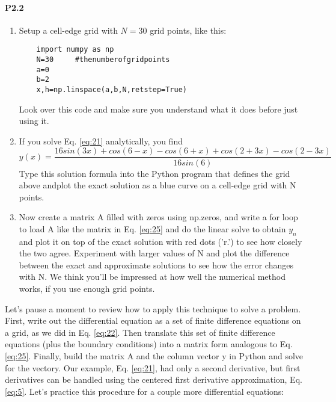 \paragraph*{P2.2}
\begin{enumerate}[label=(\alph*)]
	\item  Setup a cell-edge grid with $N=30$ grid points, like this: 
	\begin{lstlisting}	
	import numpy as np 
	N=30     #thenumberofgridpoints 
	a=0 
	b=2 
	x,h=np.linspace(a,b,N,retstep=True)
	\end{lstlisting}	
	 Look over this code and make sure you understand what it does before just using it.
	\item If you solve Eq. \eqref{eq:21} analytically, you find
	\begin{equation}
	y(x) = \frac{16sin(3x)+cos(6-x)-cos(6+x)+cos(2+3x)-cos(2-3x)}{16sin(6)}
\end{equation}		
		Type this solution formula into the Python program that defines the grid above andplot the exact solution as a blue curve on a cell-edge grid with N points.

		\item Now create a matrix A filled with zeros using np.zeros, and write a for loop to load A like the matrix in Eq. \eqref{eq:25} and do the linear solve to obtain $y_n$ and plot it on top of the exact solution with red dots ('r.') to see how closely the two agree. Experiment with larger values of N and plot the difference between the exact and approximate solutions to see how the error changes with N. We think you\rq ll be impressed at how well the numerical method works, if you use enough grid points.
\end{enumerate}

Let\rq s pause a moment to review how to apply this technique to solve a problem. First, write out the differential equation as a set of finite difference equations on a grid, as we did in Eq. \eqref{eq:22}. Then translate this set of finite difference equations (plus the boundary conditions) into a matrix form analogous to Eq. \eqref{eq:25}. Finally, build the matrix A and the column vector y in Python and solve for the vectory. Our example, Eq. \eqref{eq:21}, had only a second derivative, but first derivatives can be handled using the centered first derivative approximation, Eq. \eqref{eq:5}. Let\rq s practice this procedure for a couple more differential equations:
